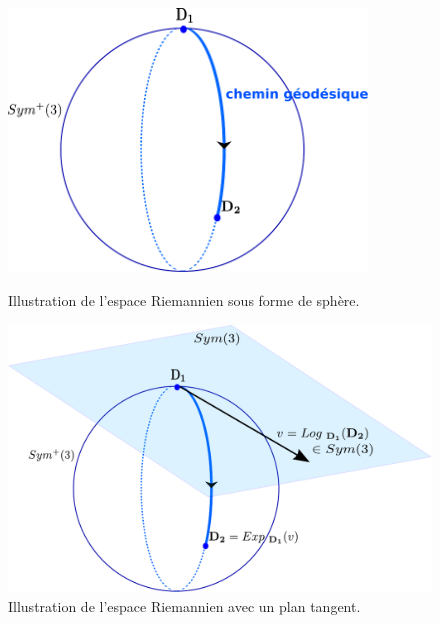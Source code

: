 \begin{figure}[ht]
    \begin{minipage}[c]{0.4\textwidth}
	    \centering
	    \includegraphics[width=0.85\textwidth]{Images/sphere.pdf}
	    \caption{\label{fig:sphere} Illustration de l'espace Riemannien sous forme de sphère.}
    \end{minipage}\hfill
    \begin{minipage}[c]{0.5\textwidth}
	    \centering
	    \includegraphics[width=1\textwidth]{Images/log_exp_map_sphere.pdf}
	    \caption{\label{fig:log_sphere} Illustration de l'espace Riemannien avec un plan tangent.}
    \end{minipage}
\end{figure}


